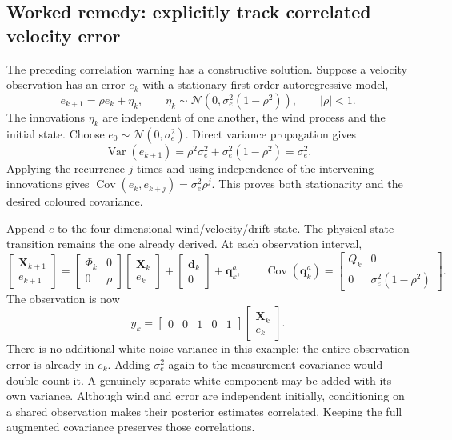 \documentclass[11pt,a4paper]{article}
\numberwithin{equation}{section}
\newcommand{\Var}{\operatorname{Var}}
\newcommand{\Cov}{\operatorname{Cov}}
\begin{document}
\subsection{Worked remedy: explicitly track correlated velocity error}
The preceding correlation warning has a constructive solution. Suppose a velocity observation has an error $e_k$ with a stationary first-order autoregressive model,
\begin{equation}
 e_{k+1}=\rho e_k+\eta_k,\qquad
 \eta_k\sim\mathcal N(0,\sigma_e^2(1-\rho^2)),\qquad |\rho|<1.
\end{equation}
The innovations $\eta_k$ are independent of one another, the wind process and the initial state. Choose $e_0\sim\mathcal N(0,\sigma_e^2)$. Direct variance propagation gives
\begin{equation}
 \Var(e_{k+1})=\rho^2\sigma_e^2+\sigma_e^2(1-\rho^2)=\sigma_e^2.
\end{equation}
Applying the recurrence $j$ times and using independence of the intervening innovations gives $\Cov(e_k,e_{k+j})=\sigma_e^2\rho^j$. This proves both stationarity and the desired coloured covariance.

Append $e$ to the four-dimensional wind/velocity/drift state. The physical state transition remains the one already derived. At each observation interval,
\begin{equation}
 \begin{bmatrix}\mathbf X_{k+1}\\e_{k+1}\end{bmatrix}
 =\begin{bmatrix}\Phi_k&0\\0&\rho\end{bmatrix}
 \begin{bmatrix}\mathbf X_k\\e_k\end{bmatrix}
 +\begin{bmatrix}\mathbf d_k\\0\end{bmatrix}+\mathbf q^a_k,
 \qquad
 \Cov(\mathbf q^a_k)=\begin{bmatrix}Q_k&0\\0&\sigma_e^2(1-\rho^2)\end{bmatrix}.
\end{equation}
The observation is now
\begin{equation}
 \boxed{y_k=\begin{bmatrix}0&0&1&0&1\end{bmatrix}
 \begin{bmatrix}\mathbf X_k\\e_k\end{bmatrix}.}
\end{equation}
There is no additional white-noise variance in this example: the entire observation error is already in $e_k$. Adding $\sigma_e^2$ again to the measurement covariance would double count it. A genuinely separate white component may be added with its own variance. Although wind and error are independent initially, conditioning on a shared observation makes their posterior estimates correlated. Keeping the full augmented covariance preserves those correlations.
\end{document}
